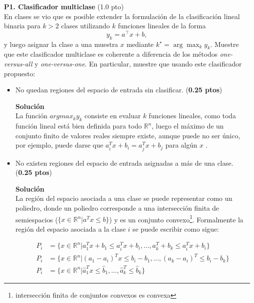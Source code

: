 \documentclass[11pt,letterpaper]{article}
\begin{document}
\noindent\textbf{P1. Clasificador multiclase} (1.0 pto)\\ 
En clases se vio que es posible extender la formulación de la clasificación lineal binaria para $k>2$ clases utilizando $k$ funciones lineales de la forma
\begin{equation*}
    y_k = a^\top x + b,
\end{equation*}
y luego asignar la clase a una muestra $x$ mediante $k^\star =\arg\max_k y_k$. 
Muestre que este clasificador multiclase es coherente a diferencia de los métodos \emph{one-versus-all} y \emph{one-versus-one}. En particular, muestre que usando este clasificador propuesto:
\begin{itemize}
    \item No quedan regiones del espacio de entrada sin clasificar. (\textbf{0.25 ptos})
    
    \textbf{Solución}\\
    
    La función $argmax_{k}y_{k}$ consiste en evaluar $k$ funciones lineales, como toda función lineal está bien definida para todo $\mathbb{R}^{n}$, luego el máximo de un conjunto finito de valores reales siempre existe, aunque puede no ser único, por ejemplo, puede darse que $a_{i}^{T}x+b_{i}= a_{j}^{T}x+b_{j}$ para algún $x$  . \\
     
    \item No existen regiones del espacio de entrada asignadas a más de una clase. (\textbf{0.25 ptos})
    
    \textbf{Solución}\\
    
    La región del espacio asociada a una clase se puede representar como un poliedro, donde un poliedro corresponde a una intersección finita de semiespacios ($\{x\in \mathbb{R}^{n}|a^{T}x\leq b\}$) y es un conjunto convexo\footnote{intersección finita de conjuntos convexos es convexa}. Formalmente la región del espacio asociada a la clase $i$ se puede escribir como sigue:

    \begin{align*}
        P_{i} &= \{x\in \mathbb{R}^{n}| a_{1}^{T}x+b_{1}\leq a_{i}^{T}x+b_{i}, \ldots, a_{k}^{T}+b_{k}\leq a_{i}^{T}x+b_{i} \}\\
        P_{i} &= \{x\in \mathbb{R}^{n}| (a_{1}-a_{i})^{T}x\leq b_{i}-b_{1}, \ldots, (a_{k}-a_{i})^{T}\leq b_{i}-b_{k} \}\\
        P_{i} &= \{x\in \mathbb{R}^{n}| \hat{a}_{1}^{T}x\leq \hat{b}_{1}, \ldots, \hat{a}_{k}^{T}\leq \hat{b}_{k}\}
    \end{align*}


\end{itemize}
\end{document}
